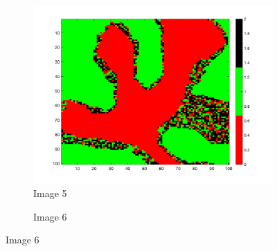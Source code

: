 \documentclass[unicode,11pt,a4paper,oneside,numbers=endperiod,openany]{scrartcl}
\begin{document}
\begin{figure}[H]
      \begin{subfigure}[b]{0.3\textwidth}
        \includegraphics[width=\textwidth]{results/iterations_1888_H_5_random_1.png}
        \caption{Image 5}
        \label{fig:image5}
      \end{subfigure}
      \begin{subfigure}[b]{0.3\textwidth}
        \caption{Image 6}
        \label{fig:image6}
      \end{subfigure}
      

\end{figure}
\end{document}
